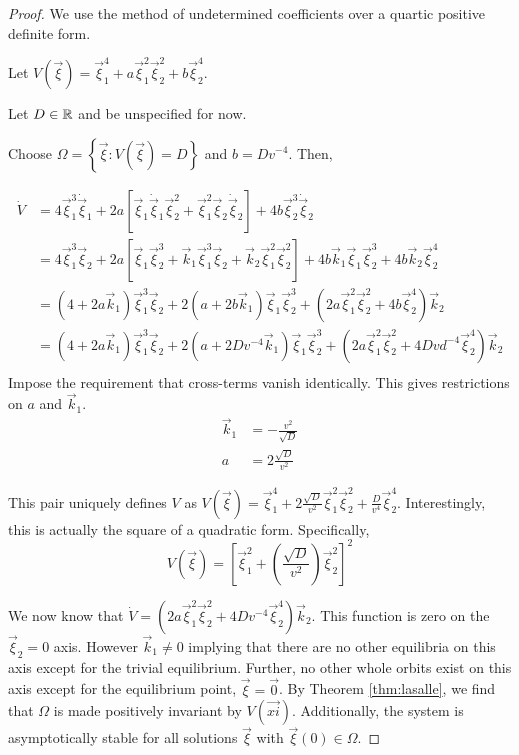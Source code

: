 \documentclass[oneside, 11pt]{book}
\begin{document}
\begin{proof}
    We use the method of undetermined coefficients over a quartic positive definite form.

    Let $V(\vec{\xi}) = \vec{\xi}_1^4 + a\vec{\xi}_1^2\vec{\xi}_2^2 + b\vec{\xi}_2^4$.

    Let $D\in\mathbb{R}$ and be unspecified for now.

    Choose $\Omega=\left\{\vec{\xi} : V(\vec{\xi}) = D\right\}$ and $b = Dv^{-4}$. Then,

    \begin{align*}
        \dot{V} &=  4\vec{\xi}_1^3\dot{\vec{\xi}}_1 + 2a\left[\vec{\xi}_1\dot{\vec{\xi}}_1\vec{\xi}_2^2 + \vec{\xi}_1^2\vec{\xi}_2\dot{\vec{\xi}}_2\right] + 4b\vec{\xi}_2^3\dot{\vec{\xi}}_2\\
                    &=  4\vec{\xi}_1^3\vec{\xi}_2 + 2a\left[\vec{\xi}_1\vec{\xi}_2^3 + \vec{k}_1\vec{\xi}_1^3\vec{\xi}_2 + \vec{k}_2\vec{\xi}_1^2\vec{\xi}_2^2\right] + 4b\vec{k}_1\vec{\xi}_1\vec{\xi}_2^3 + 4b\vec{k}_2\vec{\xi}_2^4\\
                    &=  \left(4+2a\vec{k}_1\right)\vec{\xi}_1^3\vec{\xi}_2 + 2\left(a + 2b\vec{k}_1\right)\vec{\xi}_1\vec{\xi}_2^3 + \left(2a\vec{\xi}_1^2\vec{\xi}_2^2 + 4b\vec{\xi}_2^4\right)\vec{k}_2\\
                    &=  \left(4+2a\vec{k}_1\right)\vec{\xi}_1^3\vec{\xi}_2 + 2\left(a + 2Dv^{-4}\vec{k}_1\right)\vec{\xi}_1\vec{\xi}_2^3 + \left(2a\vec{\xi}_1^2\vec{\xi}_2^2 + 4Dvd^{-4}\vec{\xi}_2^4\right)\vec{k}_2\\
    \end{align*}
    Impose the requirement that cross-terms vanish identically. This gives restrictions on $a$ and $\vec{k}_1$.
    \begin{align*}
        \vec{k}_1 &= -\frac{v^2}{\sqrt{D}}\\
        a &= 2\frac{\sqrt{D}}{v^2}
    \end{align*}

    This pair uniquely defines $V$ as $V(\vec{\xi}) = \vec{\xi}_1^4 + 2\frac{\sqrt{D}}{v^2}\vec{\xi}_1^2\vec{\xi}_2^2 + \frac{D}{v^4}\vec{\xi}_2^4$. Interestingly, this is actually the square of a quadratic form. Specifically,
    $$
        V(\vec{\xi}) = \left[\vec{\xi}_1^2 + \left(\frac{\sqrt{D}}{v^2}\right)\vec{\xi}_2^2 \right]^2
    $$

    We now know that $\dot{V} = \left(2a\vec{\xi}_1^2\vec{\xi}_2^2 + 4Dv^{-4}\vec{\xi}_2^4\right)\vec{k}_2$. This function is zero on the $\vec{\xi}_2=0$ axis. However $\vec{k}_1 \neq 0$ implying that there are no other equilibria on this axis except for the trivial equilibrium. Further, no other whole orbits exist on this axis except for the equilibrium point, $\vec{\xi}=\vec{0}$. By Theorem \ref{thm:lasalle}, we find that $\Omega$ is made positively invariant by $V(\vec{xi})$. Additionally, the system is asymptotically stable for all solutions $\vec{\xi}$ with $\vec{\xi}(0)\in\Omega$.


\end{proof}
\end{document}
